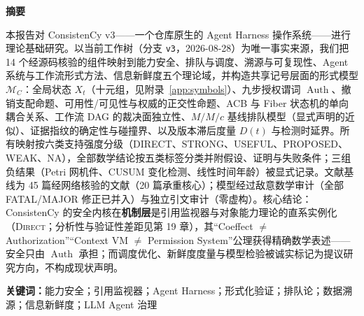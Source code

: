 \documentclass[UTF8,zihao=-4,a4paper,oneside,openany,fontset=windows]{ctexbook}
\theoremstyle{plain}
\theoremstyle{definition}
\theoremstyle{remark}
\theoremstyle{definition}
\newcommand{\DIRECT}{\textsc{Direct}}
\newcommand{\Auth}{\operatorname{Auth}}
\newcommand{\tcode}[1]{\texttt{#1}}
\begin{document}
\frontmatter
\begin{center}
{\Large\bfseries 摘要}
\end{center}
\noindent
本报告对 ConsistenCy v3——一个仓库原生的 Agent Harness 操作系统——进行理论基础研究。以当前工作树（分支 \tcode{v3}，2026-08-28）为唯一事实来源，我们把 14 个经源码核验的组件映射到能力安全、排队与调度、溯源与可复现性、Agent 系统与工作流形式方法、信息新鲜度五个理论域，并构造共享记号层面的形式模型 $\mathcal{M}_C$：全局状态 $X_t$（十元组，见附录~\ref{app:symbols}）、九步授权谓词 $\Auth$、撤销支配命题、可用性/可见性与权威的正交性命题、ACB 与 Fiber 状态机的单向耦合关系、工作流 DAG 的裁决面独立性、$M/M/c$ 基线排队模型（显式声明的近似）、证据指纹的确定性与碰撞界、以及版本滞后度量 $D(t)$ 与检测时延界。所有映射按六类支持强度分级（DIRECT、STRONG、USEFUL、PROPOSED、WEAK、NA），全部数学结论按五类标签分类并附假设、证明与失败条件；三组负结果（Petri 网机件、CUSUM 变化检测、线性时间年龄）被显式记录。文献基线为 45 篇经网络核验的文献（20 篇承重核心）；模型经过敌意数学审计（全部 FATAL/MAJOR 修正已并入）与独立引文审计（零虚构）。核心结论：ConsistenCy 的安全内核在\textbf{机制层}是引用监视器与对象能力理论的直系实例化（\DIRECT；分析性与验证性差距见第 19 章），其“Coeffect $\neq$ Authorization”“Context VM $\neq$ Permission System”公理获得精确数学表述——安全只由 $\Auth$ 承担；而调度优化、新鲜度度量与模型检验被诚实标记为提议研究方向，不构成现状声明。

\medskip
\noindent\textbf{关键词：}能力安全；引用监视器；Agent Harness；形式化验证；排队论；数据溯源；信息新鲜度；LLM Agent 治理
\clearpage

\tableofcontents
\listoffigures
\listoftables
\clearpage

\mainmatter















\appendix




\backmatter
\printbibliography[title={参考文献}]
\end{document}
